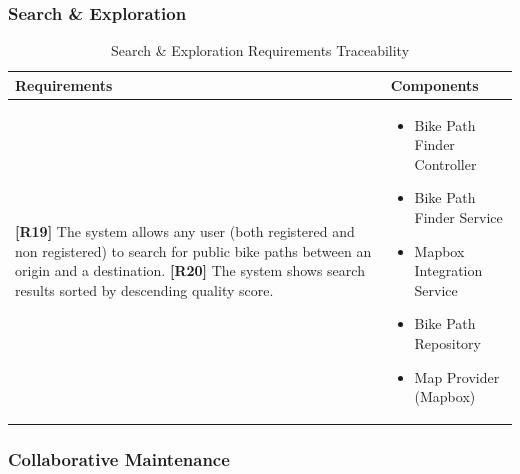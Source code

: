 \subsubsection{Search \& Exploration}

\begin{table}[H]
\centering
\begin{tabular}{|p{}|p{}|}
\hline
\textbf{Requirements} & \textbf{Components} \\
\hline

\textbf{[R19]} The system allows any user (both registered and non registered) to search for public bike paths between an origin and a destination. \newline
\textbf{[R20]} The system shows search results sorted by descending quality score.

&

\begin{itemize}
    \item Bike Path Finder Controller
    \item Bike Path Finder Service
    \item Mapbox Integration Service
    \item Bike Path Repository
    \item Map Provider (Mapbox)
\end{itemize} \\
\hline

\end{tabular}
\caption{Search \& Exploration Requirements Traceability}
\label{tab:search-requirements}
\end{table}

\subsubsection{Collaborative Maintenance}


